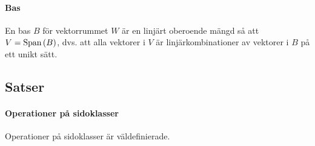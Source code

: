 \paragraph{Bas}
En bas $B$ för vektorrummet $W$ är en linjärt oberoende mängd så att $V = \text{Span}\left(B\right)$, dvs. att alla vektorer i $V$ är linjärkombinationer av vektorer i $B$ på ett unikt sätt.

\subsection{Satser}

\paragraph{Operationer på sidoklasser}
Operationer på sidoklasser är väldefinierade.

\proof